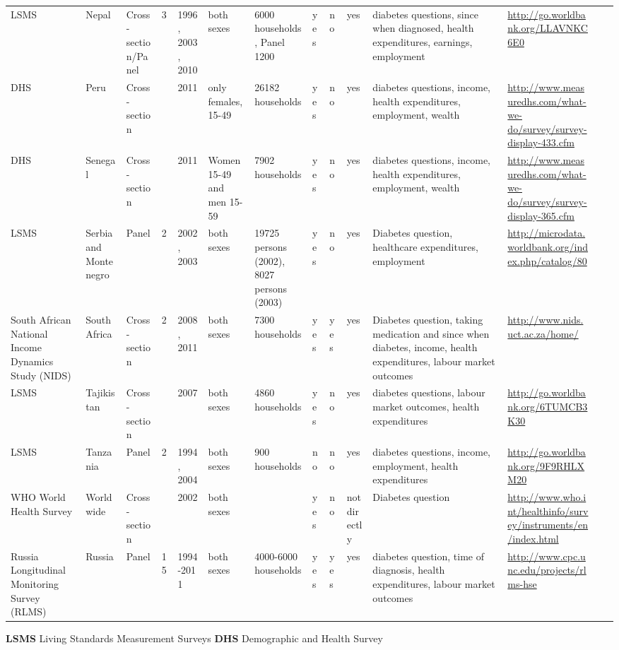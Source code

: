 \begin{landscape}
{\begin{tabularx}{\linewidth}{XXXXXXXXXXXXXX}
LSMS & Nepal & Cross-section/Panel & 3 & 1996, 2003, 2010 & both sexes & 6000 households, Panel 1200 & yes & no & yes & diabetes questions, since when diagnosed, health expenditures, earnings, employment & \url{http://go.worldbank.org/LLAVNKC6E0} \\
DHS & Peru & Cross-section &  & 2011 & only females, 15-49 & 26182 households & yes & no & yes & diabetes questions, income, health expenditures, employment, wealth & \url{http://www.measuredhs.com/what-we-do/survey/survey-display-433.cfm} \\
DHS & Senegal & Cross-section &  & 2011 & Women 15-49 and men 15-59 & 7902 households & yes & no & yes & diabetes questions, income, health expenditures, employment, wealth & \url{http://www.measuredhs.com/what-we-do/survey/survey-display-365.cfm} \\
LSMS & Serbia and Montenegro & Panel & 2 & 2002, 2003 & both sexes & 19725 persons (2002), 8027 persons (2003) & yes & no & yes & Diabetes question, healthcare expenditures, employment & \url{http://microdata.worldbank.org/index.php/catalog/80} \\
South African National Income Dynamics Study (NIDS) & South Africa & Cross-section & 2 & 2008, 2011 & both sexes & 7300 households & yes & yes & yes & Diabetes question, taking medication and since when diabetes, income, health expenditures, labour market outcomes & \url{http://www.nids.uct.ac.za/home/} \\
LSMS & Tajikistan & Cross-section &  & 2007 & both sexes & 4860 households & yes & no & yes & diabetes questions, labour market outcomes, health expenditures & \url{http://go.worldbank.org/6TUMCB3K30} \\
LSMS & Tanzania& Panel & 2 & 1994, 2004 & both sexes & 900 households & no & no & yes & diabetes questions, income, employment, health expenditures & \url{http://go.worldbank.org/9F9RHLXM20} \\
WHO World Health Survey & Worldwide & Cross-section &  & 2002 & both sexes &  & yes & no & not directly & Diabetes question &  \url{http://www.who.int/healthinfo/survey/instruments/en/index.html} \\
Russia Longitudinal Monitoring Survey (RLMS) & Russia & Panel & 15 & 1994-2011 & both sexes & 4000-6000 households & yes & yes & yes & diabetes question,  time of diagnosis, health expenditures, labour market outcomes & \url{http://www.cpc.unc.edu/projects/rlms-hse} \\ 
\bottomrule
\end{tabularx}
}
\textbf{LSMS} Living Standards Measurement Surveys \textbf{DHS} Demographic and Health Survey
\end{landscape}


